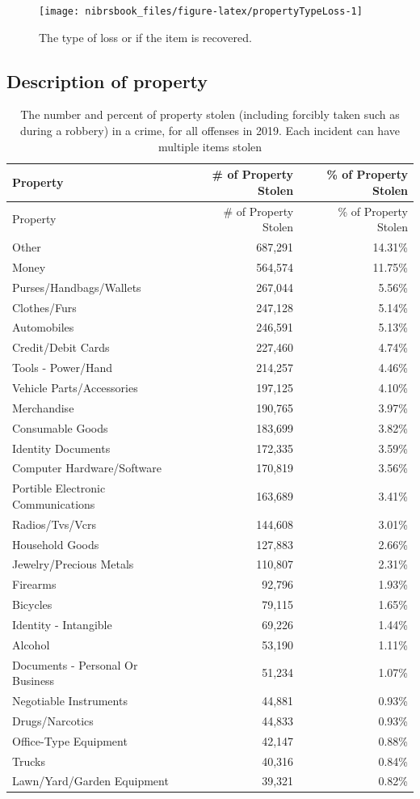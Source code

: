 \documentclass[
  12pt,
  openany]{book}
\begin{document}
\begin{figure}

{\centering \texttt{[image: nibrsbook\_files/figure-latex/propertyTypeLoss-1]} 

}

\caption{The type of loss or if the item is recovered.}\label{fig:propertyTypeLoss}
\end{figure}

\hypertarget{description-of-property}{%
\subsection{Description of property}\label{description-of-property}}

\begin{longtable}[]{@{}lrr@{}}
\caption{\label{tab:propertyStolenDescription}The number and percent of property stolen (including forcibly taken such as during a robbery) in a crime, for all offenses in 2019. Each incident can have multiple items stolen}\tabularnewline
\toprule
Property & \# of Property Stolen & \% of Property Stolen\tabularnewline
\midrule
\endfirsthead
\toprule
Property & \# of Property Stolen & \% of Property Stolen\tabularnewline
\midrule
\endhead
Other & 687,291 & 14.31\%\tabularnewline
Money & 564,574 & 11.75\%\tabularnewline
Purses/Handbags/Wallets & 267,044 & 5.56\%\tabularnewline
Clothes/Furs & 247,128 & 5.14\%\tabularnewline
Automobiles & 246,591 & 5.13\%\tabularnewline
Credit/Debit Cards & 227,460 & 4.74\%\tabularnewline
Tools - Power/Hand & 214,257 & 4.46\%\tabularnewline
Vehicle Parts/Accessories & 197,125 & 4.10\%\tabularnewline
Merchandise & 190,765 & 3.97\%\tabularnewline
Consumable Goods & 183,699 & 3.82\%\tabularnewline
Identity Documents & 172,335 & 3.59\%\tabularnewline
Computer Hardware/Software & 170,819 & 3.56\%\tabularnewline
Portible Electronic Communications & 163,689 & 3.41\%\tabularnewline
Radios/Tvs/Vcrs & 144,608 & 3.01\%\tabularnewline
Household Goods & 127,883 & 2.66\%\tabularnewline
Jewelry/Precious Metals & 110,807 & 2.31\%\tabularnewline
Firearms & 92,796 & 1.93\%\tabularnewline
Bicycles & 79,115 & 1.65\%\tabularnewline
Identity - Intangible & 69,226 & 1.44\%\tabularnewline
Alcohol & 53,190 & 1.11\%\tabularnewline
Documents - Personal Or Business & 51,234 & 1.07\%\tabularnewline
Negotiable Instruments & 44,881 & 0.93\%\tabularnewline
Drugs/Narcotics & 44,833 & 0.93\%\tabularnewline
Office-Type Equipment & 42,147 & 0.88\%\tabularnewline
Trucks & 40,316 & 0.84\%\tabularnewline
Lawn/Yard/Garden Equipment & 39,321 & 0.82\%\tabularnewline

\end{longtable}
\end{document}
